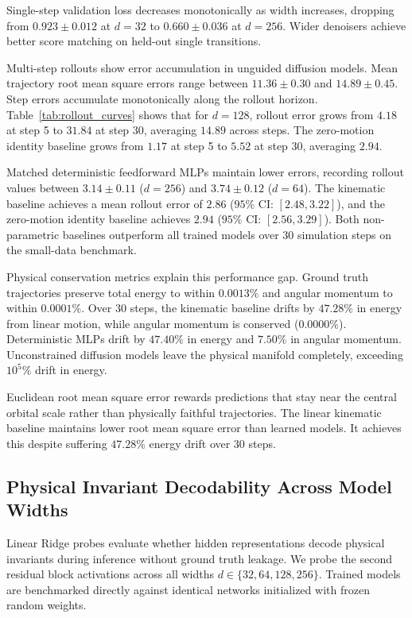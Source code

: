 \documentclass[11pt,a4paper]{article}
\begin{document}
Single-step validation loss decreases monotonically as width increases, dropping from $0.923 \pm 0.012$ at $d=32$ to $0.660 \pm 0.036$ at $d=256$. Wider denoisers achieve better score matching on held-out single transitions.

Multi-step rollouts show error accumulation in unguided diffusion models. Mean trajectory root mean square errors range between $11.36 \pm 0.30$ and $14.89 \pm 0.45$. Step errors accumulate monotonically along the rollout horizon. Table~\ref{tab:rollout_curves} shows that for $d=128$, rollout error grows from $4.18$ at step 5 to $31.84$ at step 30, averaging $14.89$ across steps. The zero-motion identity baseline grows from $1.17$ at step 5 to $5.52$ at step 30, averaging $2.94$.

Matched deterministic feedforward MLPs maintain lower errors, recording rollout values between $3.14 \pm 0.11$ ($d=256$) and $3.74 \pm 0.12$ ($d=64$). The kinematic baseline achieves a mean rollout error of $2.86$ ($95\%$ CI: $[2.48, 3.22]$), and the zero-motion identity baseline achieves $2.94$ ($95\%$ CI: $[2.56, 3.29]$). Both non-parametric baselines outperform all trained models over 30 simulation steps on the small-data benchmark.

Physical conservation metrics explain this performance gap. Ground truth trajectories preserve total energy to within $0.0013\%$ and angular momentum to within $0.0001\%$. Over 30 steps, the kinematic baseline drifts by $47.28\%$ in energy from linear motion, while angular momentum is conserved ($0.0000\%$). Deterministic MLPs drift by $47.40\%$ in energy and $7.50\%$ in angular momentum. Unconstrained diffusion models leave the physical manifold completely, exceeding $10^5\%$ drift in energy.

Euclidean root mean square error rewards predictions that stay near the central orbital scale rather than physically faithful trajectories. The linear kinematic baseline maintains lower root mean square error than learned models. It achieves this despite suffering $47.28\%$ energy drift over 30 steps.

\subsection{Physical Invariant Decodability Across Model Widths}
Linear Ridge probes evaluate whether hidden representations decode physical invariants during inference without ground truth leakage. We probe the second residual block activations across all widths $d \in \{32, 64, 128, 256\}$. Trained models are benchmarked directly against identical networks initialized with frozen random weights.
\end{document}
